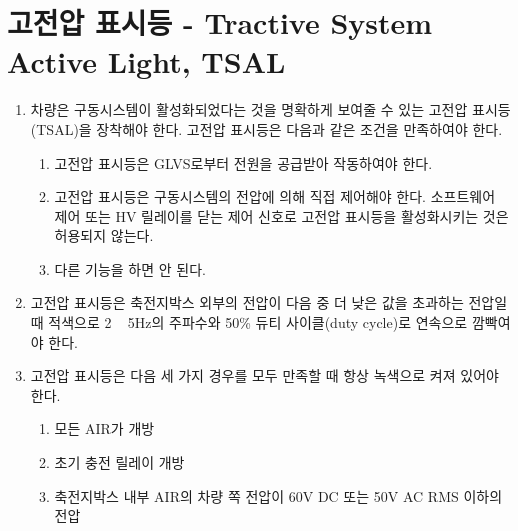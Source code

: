 \documentclass[final,a4paper,10pt]{report}
\begin{document}
\section{고전압 표시등 - Tractive System Active Light, TSAL}\label{rule:formula-technical.tractive-system-active-light}
\begin{enumerate}
  \item\label{rule:formula-technical.tractive-system-active-light.operating-conditions} 차량은 구동시스템이 활성화되었다는 것을 명확하게 보여줄 수 있는 고전압 표시등(TSAL)을 장착해야 한다. 고전압 표시등은 다음과 같은 조건을 만족하여야 한다.
    \begin{enumerate}
      \item\label{rule:formula-technical.tractive-system-active-light.operating-conditions.glvs-powered} 고전압 표시등은 GLVS로부터 전원을 공급받아 작동하여야 한다.
      \item\label{rule:formula-technical.tractive-system-active-light.operating-conditions.direct-voltage-control} 고전압 표시등은 구동시스템의 전압에 의해 직접 제어해야 한다. 소프트웨어 제어 또는 HV 릴레이를 닫는 제어 신호로 고전압 표시등을 활성화시키는 것은 허용되지 않는다.
      \item\label{rule:formula-technical.tractive-system-active-light.operating-conditions.no-other-function} 다른 기능을 하면 안 된다.
    \end{enumerate}

  \item\label{rule:formula-technical.tractive-system-active-light.red-blink-voltage-threshold} 고전압 표시등은 축전지박스 외부의 전압이 {\color{blue}다음 중 더 낮은 값을} 초과하는 전압일 때 적색으로 2 \string~ 5Hz의 주파수{\color{blue}와 50\% 듀티 사이클(duty cycle)}로 연속으로 깜빡여야 한다.

  \item\label{rule:formula-technical.tractive-system-active-light.green-on-conditions} 고전압 표시등은 다음 세 가지 경우를 모두 만족할 때 항상 녹색으로 켜져 있어야 한다. \label{item:고전압 표시등 녹색}
    \begin{enumerate}
      \item\label{rule:formula-technical.tractive-system-active-light.green-on-conditions.all-airs-open} 모든 AIR가 개방
      \item\label{rule:formula-technical.tractive-system-active-light.green-on-conditions.precharge-relay-open} 초기 충전 릴레이 개방
      \item\label{rule:formula-technical.tractive-system-active-light.green-on-conditions.air-downstream-voltage-limit} 축전지박스 내부 AIR의 차량 쪽 전압이 60V DC 또는 50V AC RMS 이하의 전압
    \end{enumerate}


\end{enumerate}
\end{document}
